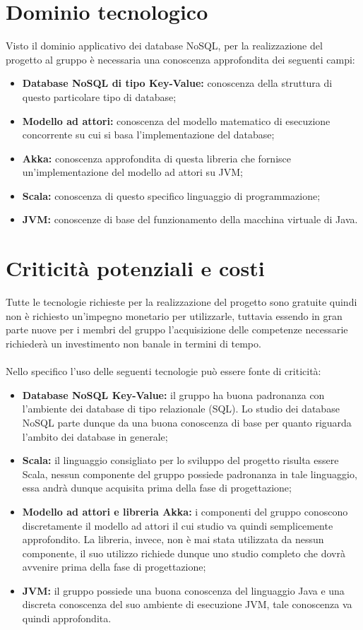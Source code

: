 \documentclass[a4paper]{report}
\begin{document}
		\section{Dominio tecnologico}
			Visto il dominio applicativo dei database NoSQL, per la realizzazione del progetto al gruppo è
			necessaria una conoscenza approfondita dei seguenti campi:
			\begin{itemize}
				\item \textbf{Database NoSQL di tipo Key-Value:} conoscenza della struttura di questo 
				particolare tipo di database;
				\item \textbf{Modello ad attori:} conoscenza del modello matematico di 
				esecuzione concorrente su cui si basa l'implementazione del database;
				\item \textbf{Akka:} conoscenza approfondita di questa libreria che fornisce 
				 un'implementazione del modello ad attori su JVM;
				\item \textbf{Scala:} conoscenza di questo specifico linguaggio di programmazione;
				\item \textbf{JVM:} conoscenze di base del funzionamento della macchina virtuale di Java.
			\end{itemize}
		\section{Criticità potenziali e costi}
			Tutte le tecnologie richieste per la realizzazione del progetto sono gratuite quindi non è richiesto
			un'impegno monetario per utilizzarle, tuttavia essendo in gran parte nuove per i membri del gruppo 
			l'acquisizione delle competenze necessarie richiederà un investimento non banale in termini di
			 tempo.
			\\ \\
			Nello specifico l'uso delle seguenti tecnologie può essere fonte di criticità:
			\begin{itemize}
				\item \textbf{Database NoSQL Key-Value:} il gruppo ha buona padronanza con l'ambiente dei 
				database di tipo relazionale (SQL). Lo studio dei database NoSQL parte dunque 
				da una buona conoscenza di base per quanto riguarda l'ambito dei database in generale;
				\item \textbf{Scala:} il linguaggio consigliato per lo sviluppo del progetto risulta essere Scala, 
				nessun componente del gruppo possiede padronanza in tale linguaggio, essa andrà dunque 
				acquisita prima della fase di progettazione;
				\item \textbf{Modello ad attori e libreria Akka:} i componenti del gruppo conoscono
				 discretamente il modello ad attori il cui studio va quindi semplicemente approfondito. La 
				 libreria, invece, non è mai stata utilizzata da nessun componente, il suo utilizzo richiede dunque
				 uno studio completo che dovrà avvenire prima della fase di progettazione;
				 \item \textbf{JVM:} il gruppo possiede una buona conoscenza del linguaggio Java e una 
				 discreta conoscenza del suo ambiente di esecuzione JVM, tale conoscenza va quindi
				  approfondita.
			\end{itemize}
\end{document}
